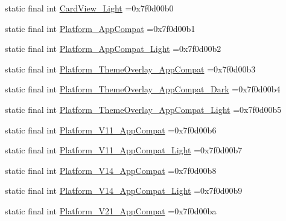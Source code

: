 \begin{DoxyCompactItemize}
\item 
static final int \mbox{\hyperlink{classbr_1_1unb_1_1cic_1_1mp_1_1marketmaster_1_1R_1_1style_a089ce1cb15e45035acd4f6d9507c6f1e}{Card\+View\+\_\+\+Light}} =0x7f0d00b0
\item 
static final int \mbox{\hyperlink{classbr_1_1unb_1_1cic_1_1mp_1_1marketmaster_1_1R_1_1style_a0b3b62d44dacb2006718ef00a2f6e96d}{Platform\+\_\+\+App\+Compat}} =0x7f0d00b1
\item 
static final int \mbox{\hyperlink{classbr_1_1unb_1_1cic_1_1mp_1_1marketmaster_1_1R_1_1style_ac76d3231d0307ba30deeb35124e8cb75}{Platform\+\_\+\+App\+Compat\+\_\+\+Light}} =0x7f0d00b2
\item 
static final int \mbox{\hyperlink{classbr_1_1unb_1_1cic_1_1mp_1_1marketmaster_1_1R_1_1style_a440bc35b6ce429cf413a1ceeb34551e6}{Platform\+\_\+\+Theme\+Overlay\+\_\+\+App\+Compat}} =0x7f0d00b3
\item 
static final int \mbox{\hyperlink{classbr_1_1unb_1_1cic_1_1mp_1_1marketmaster_1_1R_1_1style_af53a8e58fb8a3f6e09872d90e099a7be}{Platform\+\_\+\+Theme\+Overlay\+\_\+\+App\+Compat\+\_\+\+Dark}} =0x7f0d00b4
\item 
static final int \mbox{\hyperlink{classbr_1_1unb_1_1cic_1_1mp_1_1marketmaster_1_1R_1_1style_aa147b2c7688a09ba524031933a9773fb}{Platform\+\_\+\+Theme\+Overlay\+\_\+\+App\+Compat\+\_\+\+Light}} =0x7f0d00b5
\item 
static final int \mbox{\hyperlink{classbr_1_1unb_1_1cic_1_1mp_1_1marketmaster_1_1R_1_1style_aec5620f8b9e6fbb471dc9d7f0aa7cd06}{Platform\+\_\+\+V11\+\_\+\+App\+Compat}} =0x7f0d00b6
\item 
static final int \mbox{\hyperlink{classbr_1_1unb_1_1cic_1_1mp_1_1marketmaster_1_1R_1_1style_a22f8a4d45c4d1ae4f1283f23837462a7}{Platform\+\_\+\+V11\+\_\+\+App\+Compat\+\_\+\+Light}} =0x7f0d00b7
\item 
static final int \mbox{\hyperlink{classbr_1_1unb_1_1cic_1_1mp_1_1marketmaster_1_1R_1_1style_a3c7e0cee42f4488d506d5ce8c72fb2d3}{Platform\+\_\+\+V14\+\_\+\+App\+Compat}} =0x7f0d00b8
\item 
static final int \mbox{\hyperlink{classbr_1_1unb_1_1cic_1_1mp_1_1marketmaster_1_1R_1_1style_a87d5807a48b5a909afdbd78f6d95004a}{Platform\+\_\+\+V14\+\_\+\+App\+Compat\+\_\+\+Light}} =0x7f0d00b9
\item 
static final int \mbox{\hyperlink{classbr_1_1unb_1_1cic_1_1mp_1_1marketmaster_1_1R_1_1style_a27be5ad3c4ef6e55e102366b0775d15a}{Platform\+\_\+\+V21\+\_\+\+App\+Compat}} =0x7f0d00ba
\item 

\end{DoxyCompactItemize}
